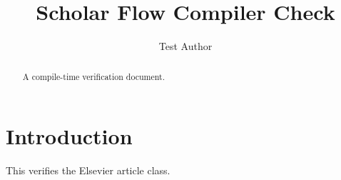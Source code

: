 \documentclass[preprint,12pt]{elsarticle}
\begin{document}
\begin{frontmatter}
\title{Scholar Flow Compiler Check}
\author{Test Author}
\begin{abstract}A compile-time verification document.\end{abstract}
\end{frontmatter}
\section{Introduction}
This verifies the Elsevier article class.
\end{document}
